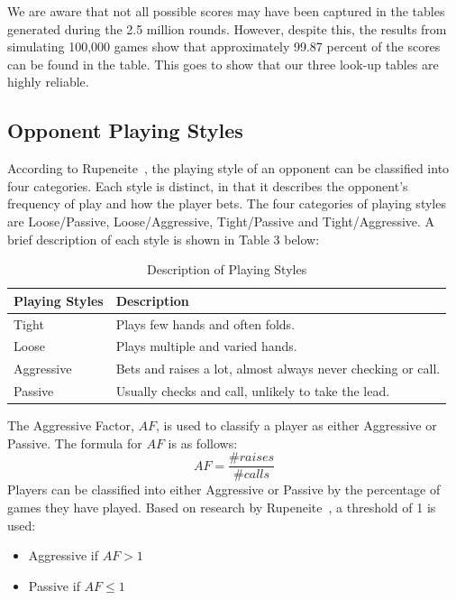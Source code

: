 \documentclass{article}
\begin{document}
\noindent We are aware that not all possible scores may have been captured in the tables generated during the 2.5 million rounds. However, despite this, the results from simulating 100,000 games show that approximately 99.87 percent of the scores can be found in the table. This goes to show that our three look-up tables are highly reliable.

\subsection{Opponent Playing Styles}

According to Rupeneite~, the playing style of an opponent can be classified into four categories. Each style is distinct, in that it describes the opponent's frequency of play and how the player bets. The four categories of playing styles are Loose/Passive, Loose/Aggressive, Tight/Passive and Tight/Aggressive. A brief description of each style is shown in Table 3 below:

\begin{table}[h!]
  \begin{center}
    \begin{tabular}{|l|p{5cm}|}
    \hline
      \textbf{Playing Styles} & \textbf{Description} \\
      \hline
      Tight & Plays few hands and often folds. \\
      \hline
      Loose & Plays multiple and varied hands.  \\
      \hline
      Aggressive &  Bets and raises a lot, almost always never checking or call. \\
      \hline
      Passive & Usually checks and call, unlikely to take the lead. \\
      \hline
    \end{tabular}
    \caption{Description of Playing Styles}
    \label{tab:table3}
  \end{center}
\end{table}
The Aggressive Factor, $AF$, is used to classify a player as either Aggressive or Passive. The formula for $AF$ is as follows:
\begin{displaymath}
  AF = \frac{\text{\# }raises}{\text{\# }calls}
\end{displaymath}
\noindent Players can be classified into either Aggressive or Passive by the percentage of games they have played. Based on research by Rupeneite~, a threshold of 1 is used:
\begin{itemize}
	\item Aggressive if $AF > 1$
	\item Passive if $AF \leq 1$
\end{itemize}
\end{document}
